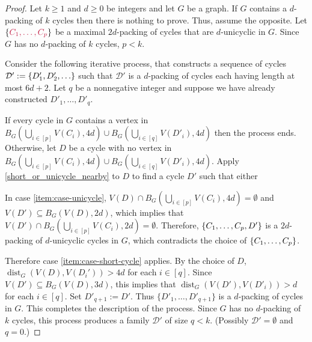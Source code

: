 \documentclass{patmorin}
\newcommand{\gwen}[1]{\textcolor{Purple}{Gwen: #1}}
\DeclareMathOperator{\dist}{dist}
\DeclarePairedDelimiter\set{\{}{\}}
\begin{document}
\begin{proof}
  Let $k\ge 1$ and $d\ge 0$ be integers and let $G$ be a graph. If $G$ contains a $d$-packing of $k$ cycles then there is nothing to prove. Thus, assume the opposite. Let $\set{\mathdefin{C_1,\ldots,C_p}}$ be a maximal $2d$-packing of cycles that are $d$-unicyclic in $G$.  Since $G$ has no $d$-packing of $k$ cycles, $p<k$.

  Consider the following iterative process, that
  constructs a sequence of cycles
  $\mathcal{D}':=\set{D'_1,D'_2,\ldots}$ such that $\mathcal{D}'$ is a $d$-packing of cycles each having length at most $6d+2$. Let $q$ be a nonnegative integer and suppose we have already constructed $D'_1,\ldots,D'_{q}$.

  If every cycle in $G$ contains a vertex in  $B_G(\bigcup_{i\in[p]} V(C_i),4d)\cup B_G(\bigcup_{i\in[q]}V(D'_i),4d)$ then the process ends.  Otherwise, let $D$ be a cycle with no vertex in $B_G(\bigcup_{i\in[p]} V(C_i),4d)\cup B_G(\bigcup_{i\in[q]}V(D'_i),4d)$.   Apply \cref{short_or_unicycle_nearby} to $D$ to find a cycle $D'$ such that either
   In case \cref{item:case-unicycle},
   $V(D)\cap B_G(\bigcup_{i\in[p]} V(C_i),4d)=\emptyset$ and $V(D')\subseteq B_G(V(D),2d)$, which implies that $V(D')\cap B_G(\bigcup_{i\in[p]} V(C_i),2d)=\emptyset$. Therefore, $\set{C_1,\ldots,C_p,D'}$ is a $2d$-packing of $d$-unicyclic cycles in $G$, which contradicts the choice of $\set{C_1,\ldots,C_p}$.

   Therefore case \cref{item:case-short-cycle} applies.  By the choice of $D$,
   $\dist_G(V(D),V(D_i'))>4d$ for each $i\in[q]$.  Since $V(D')\subseteq B_G(V(D),3d)$, this implies that $\dist_G(V(D'),V(D'_i))>d$ for each $i\in[q]$. Set $D'_{q+1}:=D'$.
   Thus $\{D'_1,\ldots,D'_{q+1}\}$ is a $d$-packing of cycles in $G$.
   This completes the description of the process.
   Since $G$ has no $d$-packing of $k$ cycles, this process produces a family $\mathcal{D'}$ of size $q<k$.
   (Possibly $\mathcal{D'}=\emptyset$ and $q=0$.)


\end{proof}
\end{document}
